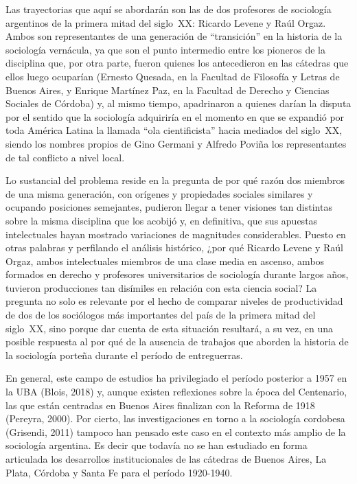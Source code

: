 Las trayectorias que aquí se abordarán son las de dos profesores de sociología argentinos de la primera mitad del siglo~XX: Ricardo Levene y Raúl Orgaz. Ambos son representantes de una generación de \enquote{transición} en la historia de la sociología vernácula, ya que son el punto intermedio entre los pioneros de la disciplina que, por otra parte, fueron quienes los antecedieron en las cátedras que ellos luego ocuparían (Ernesto Quesada, en la Facultad de Filosofía y Letras de Buenos Aires, y Enrique Martínez Paz, en la Facultad de Derecho y Ciencias Sociales de Córdoba) y, al mismo tiempo, apadrinaron a quienes darían la disputa por el sentido que la sociología adquiriría en el momento en que se expandió por toda América Latina la llamada \enquote{ola cientificista} hacia mediados del siglo~XX, siendo los nombres propios de Gino Germani y Alfredo Poviña los representantes de tal conflicto a nivel local.

Lo sustancial del problema reside en la pregunta de por qué razón dos miembros de una misma generación, con orígenes y propiedades sociales similares y ocupando posiciones semejantes, pudieron llegar a tener visiones tan distintas sobre la misma disciplina que los acobijó y, en definitiva, que sus apuestas intelectuales hayan mostrado variaciones de magnitudes considerables. Puesto en otras palabras y perfilando el análisis histórico, ¿por qué Ricardo Levene y Raúl Orgaz, ambos intelectuales miembros de una clase media en ascenso, ambos formados en derecho y profesores universitarios de sociología durante largos años, tuvieron producciones tan disímiles en relación con esta ciencia social? La pregunta no solo es relevante por el hecho de comparar niveles de productividad de dos de los sociólogos más importantes del país de la primera mitad del siglo~XX, sino porque dar cuenta de esta situación resultará, a su vez, en una posible respuesta al por qué de la ausencia de trabajos que aborden la historia de la sociología porteña durante el período de entreguerras.

En general, este campo de estudios ha privilegiado el período posterior a 1957 en la UBA \parencite[por ejemplo][entre otros]{1450-VERON1974,1508-SIDICARO1993}(Blois, 2018) y, aunque existen reflexiones sobre la época del Centenario, las que están centradas en Buenos Aires finalizan con la Reforma de 1918 (Pereyra, 2000). Por cierto, las investigaciones en torno a la sociología cordobesa \parencite[por ejemplo][]{1447-CARACCIOLO2010,1528-REQUENA2010}(Grisendi, 2011) tampoco han pensado este caso en el contexto más amplio de la sociología argentina. Es decir que todavía no se han estudiado en forma articulada los desarrollos institucionales de las cátedras de Buenos Aires, La Plata, Córdoba y Santa Fe para el período 1920-1940.


